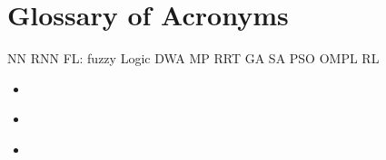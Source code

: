 \chapter*{Glossary of Acronyms}

NN
RNN
FL: fuzzy Logic
DWA
MP
RRT
GA
SA
PSO
OMPL
RL
\begin{itemize}
    \item \textbf{} 
    \item \textbf{} 

    \newpage
    \thispagestyle{acronyms}
    \item \textbf{} 

\end{itemize}

\newpage







